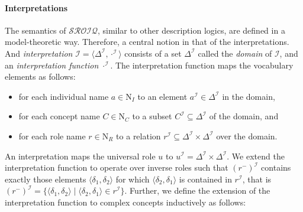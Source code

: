 \paragraph{Interpretations} \label{interpretations}

The semantics of $\mathcal{SROIQ}$, similar to other description logics, are defined in a model-theoretic way. Therefore, a central notion in that of the interpretations. And \emph{interpretation} $\mathcal{I} = \langle \Delta^\mathcal{I}, \cdot^\mathcal{I} \rangle$ consists of a set $\Delta^\mathcal{I}$ called the \emph{domain} of $\mathcal{I}$, and an \emph{interpretation function} $\cdot^\mathcal{I}$. The interpretation function maps the vocabulary elements as follows:

\begin{itemize}
    \item for each individual name $a \in \mathrm{N}_I$ to an element $a^\mathcal{I} \in \Delta^\mathcal{I}$ in the domain,
    \item for each concept name $C \in \mathrm{N}_C$ to a subset $C^\mathcal{I} \subseteq \Delta^\mathcal{I}$ of the domain, and
    \item for each role name $r \in \mathrm{N}_R$ to a relation $r^\mathcal{I} \subseteq \Delta^\mathcal{I} \times \Delta^\mathcal{I}$ over the domain.
\end{itemize}

An interpretation maps the universal role $u$ to $u^\mathcal{I} = \Delta^\mathcal{I} \times \Delta^\mathcal{I}$.  We extend the interpretation function to operate over inverse roles such that  $\left(r^-\right)^\mathcal{I}$ contains exactly those elements $\langle \delta_1, \delta_2 \rangle$ for which $\langle \delta_2, \delta_1 \rangle$ is contained in $r^\mathcal{I}$, that is  $\left(r^-\right)^\mathcal{I} = \{ \langle \delta_1, \delta_2 \rangle \mid \langle \delta_2, \delta_1 \rangle \in r^\mathcal{I} \}$. Further, we define the extension of the interpretation function to complex concepts inductively as follows:

